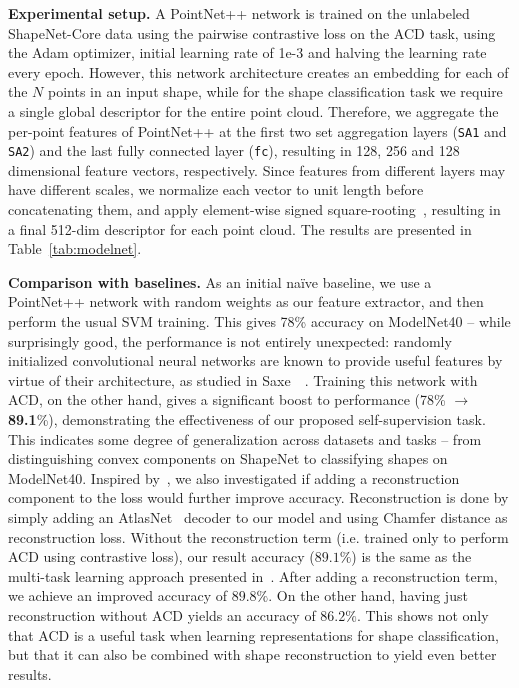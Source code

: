 \vspace{2mm}
\noindent
\textbf{Experimental setup.} 
A PointNet++ network is trained on the unlabeled ShapeNet-Core data using the pairwise contrastive loss on the ACD task, using the Adam optimizer, initial learning rate of 1e-3 and halving the learning rate every epoch. 
However, this network architecture creates an embedding for each of the $N$ points in an input shape, 
while for the shape classification task we require a single global descriptor for the entire point cloud.
Therefore, we aggregate the per-point features of PointNet++ at the first two set aggregation layers (\texttt{SA1} and \texttt{SA2}) and the last fully connected layer (\texttt{fc}), resulting in 128, 256 and 128 dimensional feature vectors, respectively. Since features from different layers may have different scales, we normalize each vector to unit length before concatenating them, and apply element-wise signed square-rooting~\cite{sanchez2013image}, resulting in a final 512-dim descriptor for each point cloud.
The results are presented in Table~\ref{tab:modelnet}.
 
\vspace{2mm}
\noindent
\textbf{Comparison with baselines.}
As an initial na\"ive baseline, we use a PointNet++ network with random weights as our feature extractor, 
and then perform the usual SVM training. 
This gives 78\% accuracy on ModelNet40 -- while surprisingly good, the performance is not entirely unexpected: 
randomly initialized convolutional neural networks are known to provide useful features by virtue of their architecture, 
as studied in Saxe~\etal~\cite{saxe2011random}. 
Training this network with ACD, on the other hand, gives a significant boost to performance (78\% $\rightarrow$ \textbf{89.1}\%), 
demonstrating the effectiveness of our proposed self-supervision task. 
This indicates some degree of generalization across datasets and tasks -- from distinguishing convex components on ShapeNet to classifying shapes on ModelNet40.
Inspired by~\cite{hassani2019unsupervised}, we also investigated if adding a reconstruction component to the loss
would further improve accuracy.
Reconstruction is done by simply adding an AtlasNet~\cite{atlasnet} decoder to our model and using Chamfer distance
as reconstruction loss.
Without the reconstruction term (i.e. trained only to perform ACD using contrastive loss), our result accuracy ($89.1\%$) is the same as the multi-task learning approach presented in~\cite{hassani2019unsupervised}.
After adding a reconstruction term, we achieve an improved accuracy of  $\mathbf{89.8\%}$.
On the other hand, having just reconstruction without ACD yields an accuracy of $86.2\%$.
This shows not only that ACD is a useful task when learning representations for shape classification, but that it can also be combined
with shape reconstruction to yield even better results.

